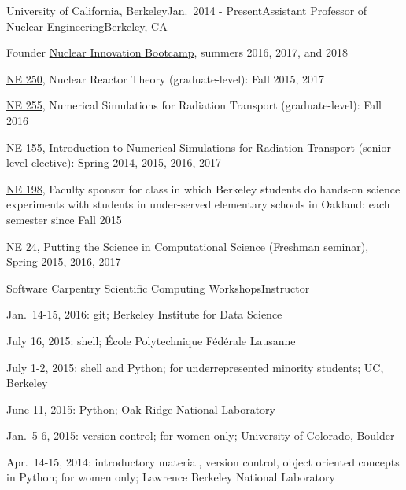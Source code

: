 \begin{rSubsection}{University of California, Berkeley}{Jan.\ 2014 - Present}{Assistant Professor of Nuclear Engineering}{Berkeley, CA}
\item Founder \href{http://nuclearinnovationalliance.org/bootcamp}{Nuclear Innovation Bootcamp}, summers 2016, 2017, and 2018 
\item \href{https://github.com/rachelslaybaugh/NE250 }{NE 250}, Nuclear Reactor Theory (graduate-level): Fall 2015, 2017
\item \href{https://github.com/rachelslaybaugh/NE255}{NE 255}, Numerical Simulations for Radiation Transport (graduate-level): Fall 2016
\item \href{https://github.com/rachelslaybaugh/NE155}{NE 155}, Introduction to Numerical Simulations for Radiation Transport (senior-level elective): Spring 2014, 2015, 2016, 2017
\item \href{http://soesberkeley.weebly.com/}{NE 198}, Faculty sponsor for class in which Berkeley students do hands-on science experiments with students in under-served elementary schools in Oakland: each semester since Fall 2015
\item \href{https://github.com/rachelslaybaugh/NE24}{NE 24}, Putting the Science in Computational Science (Freshman seminar), Spring 2015, 2016, 2017
\end{rSubsection}


\begin{rSubsection}{Software Carpentry Scientific Computing Workshops}{}{Instructor}{}
\item Jan.\ 14-15, 2016: git; Berkeley Institute for Data Science
\item July 16, 2015: shell; \'{E}cole Polytechnique F\'{e}d\'{e}rale Lausanne
\item July 1-2, 2015: shell and Python; for underrepresented minority students; UC, Berkeley
\item June 11, 2015: Python; Oak Ridge National Laboratory
\item Jan.\ 5-6, 2015: version control; for women only; University of Colorado, Boulder
\item Apr.\ 14-15, 2014: introductory material, version control, object oriented concepts in Python; for women only; Lawrence Berkeley National Laboratory
\end{rSubsection}



